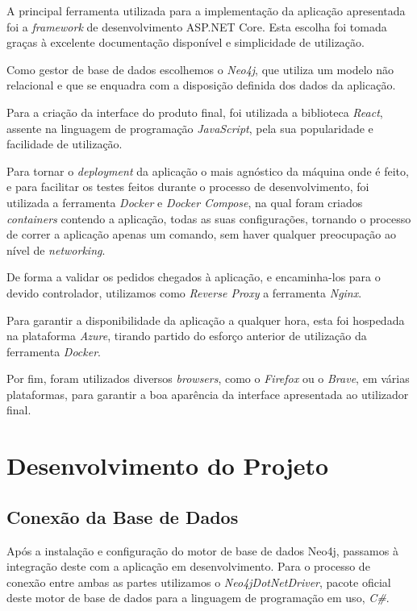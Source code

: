 \documentclass[a4paper]{report}
\begin{document}
A principal ferramenta utilizada para a implementação da aplicação apresentada
foi a \textit{framework} de desenvolvimento ASP.NET Core. Esta escolha foi
tomada graças à excelente documentação disponível e simplicidade de utilização.

Como gestor de base de dados escolhemos o \textit{Neo4j}, que utiliza um modelo
não relacional e que se enquadra com a disposição definida dos dados da
aplicação.

Para a criação da interface do produto final, foi utilizada a biblioteca
\textit{React}, assente na linguagem de programação \textit{JavaScript}, pela
sua popularidade e facilidade de utilização.

Para tornar o \textit{deployment} da aplicação o mais agnóstico da máquina onde
é feito, e para facilitar os testes feitos durante o processo de
desenvolvimento, foi utilizada a ferramenta \textit{Docker} e \textit{Docker
Compose}, na qual foram criados \textit{containers} contendo a aplicação, todas
as suas configurações, tornando o processo de correr a aplicação apenas um
comando, sem haver qualquer preocupação ao nível de \textit{networking}.

De forma a validar os pedidos chegados à aplicação, e encaminha-los para o
devido controlador, utilizamos como \textit{Reverse Proxy} a ferramenta
\textit{Nginx}.

Para garantir a disponibilidade da aplicação a qualquer hora, esta foi hospedada
na plataforma \textit{Azure}, tirando partido do esforço anterior de utilização
da ferramenta \textit{Docker}.

Por fim, foram utilizados diversos \textit{browsers}, como o \textit{Firefox} ou
o \textit{Brave}, em várias plataformas, para garantir a boa aparência da
interface apresentada ao utilizador final.

\chapter{Desenvolvimento do Projeto}
    \section{Conexão da Base de Dados}
    Após a instalação e configuração do motor de base de dados Neo4j, passamos à
    integração deste com a aplicação em desenvolvimento. Para o processo de
    conexão entre ambas as partes utilizamos o \textit{Neo4jDotNetDriver},
    pacote oficial deste motor de base de dados para a linguagem de programação
    em uso, \textit{C\#}.
\end{document}
